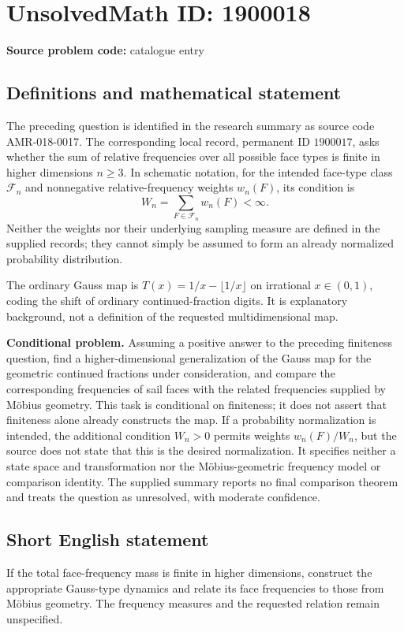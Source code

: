 \documentclass[11pt]{article}
\begin{document}
\section*{UnsolvedMath ID: 1900018}
\textbf{Source problem code:} catalogue entry
\subsection{Definitions and mathematical statement}
The preceding question is identified in the research summary as source code AMR-018-0017. The corresponding local record, permanent ID $1900017$, asks whether the sum of relative frequencies over all possible face types is finite in higher dimensions $n\geq3$. In schematic notation, for the intended face-type class $\mathcal F_n$ and nonnegative relative-frequency weights $w_n(F)$, its condition is
\[
W_n=\sum_{F\in\mathcal F_n}w_n(F)<\infty.
\]
Neither the weights nor their underlying sampling measure are defined in the supplied records; they cannot simply be assumed to form an already normalized probability distribution.

The ordinary Gauss map is $T(x)=1/x-\lfloor1/x\rfloor$ on irrational $x\in(0,1)$, coding the shift of ordinary continued-fraction digits. It is explanatory background, not a definition of the requested multidimensional map.

\textbf{Conditional problem.} Assuming a positive answer to the preceding finiteness question, find a higher-dimensional generalization of the Gauss map for the geometric continued fractions under consideration, and compare the corresponding frequencies of sail faces with the related frequencies supplied by M\"obius geometry. This task is conditional on finiteness; it does not assert that finiteness alone already constructs the map. If a probability normalization is intended, the additional condition $W_n>0$ permits weights $w_n(F)/W_n$, but the source does not state that this is the desired normalization. It specifies neither a state space and transformation nor the M\"obius-geometric frequency model or comparison identity. The supplied summary reports no final comparison theorem and treats the question as unresolved, with moderate confidence.
\subsection{Short English statement}
If the total face-frequency mass is finite in higher dimensions, construct the appropriate Gauss-type dynamics and relate its face frequencies to those from M\"obius geometry. The frequency measures and the requested relation remain unspecified.
\end{document}
